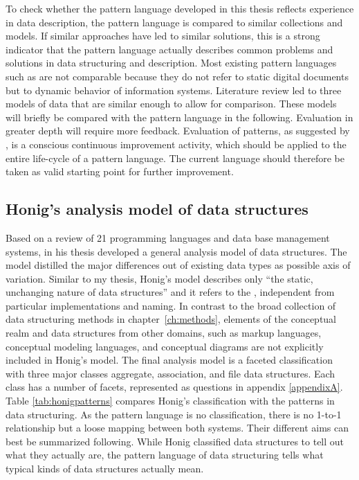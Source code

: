 To check whether the pattern language developed in this thesis reflects
experience in data description, the pattern language is compared to similar
collections and models. If similar approaches have led to similar solutions,
this is a strong indicator that the pattern language actually describes common
problems and solutions in data structuring and description.  Most existing
pattern languages such as \textcite{Gamma1994} are not comparable because they
do not refer to static digital documents but to dynamic behavior of information
systems. Literature review led to three models of data that are similar enough
to allow for comparison. These models will briefly be compared with the pattern
language in the following. Evaluation in greater depth will require more
feedback.  Evaluation of patterns, as suggested by \textcite{Petter2010}, is a
conscious continuous improvement activity, which should be applied to the
entire life-cycle of a pattern language. The current language should therefore
be taken as valid starting point for further improvement.

\subsection{Honig's analysis model of data structures}
\label{sec:honig}

Based on a review of 21 programming languages and data base management systems,
\textcite{Honig1975} in his thesis developed a general analysis model of data
structures. The model distilled the major differences out of existing data
types as possible axis of variation. Similar to my thesis, Honig's model
describes only ``the static, unchanging nature of data structures'' and it
refers to the , independent from particular implementations
and naming. In contrast to the broad collection of data structuring methods in
chapter~\ref{ch:methods}, elements of the conceptual realm and data structures
from other domains, such as markup languages, conceptual modeling languages,
and conceptual diagrams are not explicitly included in Honig's model. The final
analysis model is a faceted classification with three major classes aggregate,
association, and file data structures. Each class has a number of facets,
represented as questions in appendix \ref{appendixA}. Table
\ref{tab:honigpatterns} compares Honig's classification with the patterns in
data structuring. As the pattern language is no classification, there is no
1-to-1 relationship but a loose mapping between both systems.  Their different
aims can best be summarized following. While Honig classified data structures
to tell out what they actually are, the pattern language of data structuring
tells what typical kinds of data structures actually mean.

